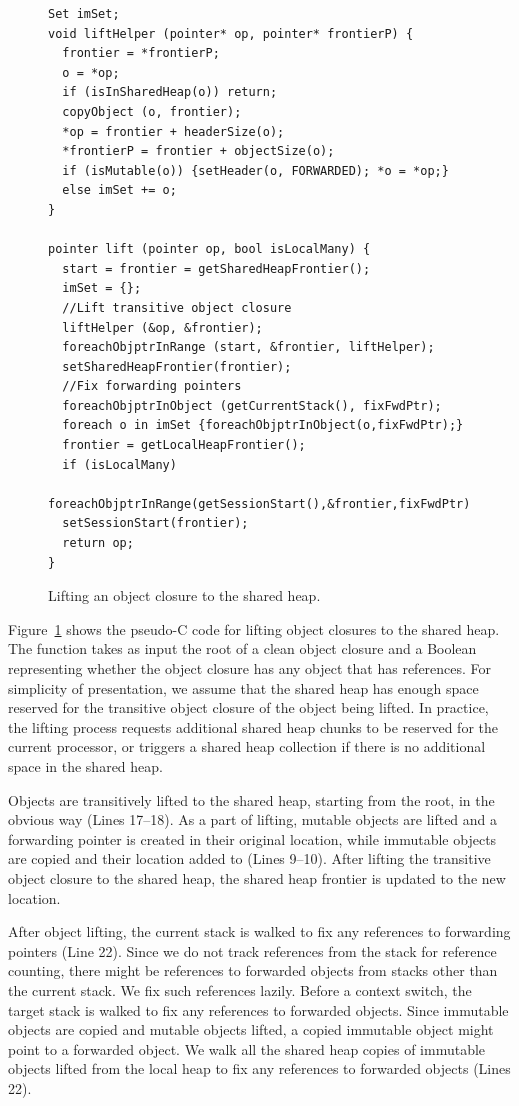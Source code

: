 \begin{figure}[t]
\renewcommand{\baselinestretch}{1.3}
\begin{lstlisting}
Set imSet;
void liftHelper (pointer* op, pointer* frontierP) {
  frontier = *frontierP;
  o = *op;
  if (isInSharedHeap(o)) return;
  copyObject (o, frontier);
  *op = frontier + headerSize(o);
  *frontierP = frontier + objectSize(o);
  if (isMutable(o)) {setHeader(o, FORWARDED); *o = *op;}
  else imSet += o;
}

pointer lift (pointer op, bool isLocalMany) {
  start = frontier = getSharedHeapFrontier();
  imSet = {};
  //Lift transitive object closure
  liftHelper (&op, &frontier);
  foreachObjptrInRange (start, &frontier, liftHelper);
  setSharedHeapFrontier(frontier);
  //Fix forwarding pointers
  foreachObjptrInObject (getCurrentStack(), fixFwdPtr);
  foreach o in imSet {foreachObjptrInObject(o,fixFwdPtr);}
  frontier = getLocalHeapFrontier();
  if (isLocalMany)
    foreachObjptrInRange(getSessionStart(),&frontier,fixFwdPtr);
  setSessionStart(frontier);
  return op;
}
\end{lstlisting}
\caption{Lifting an object closure to the shared heap.}
\label{code:lift}
\end{figure}


Figure~\ref{code:lift} shows the pseudo-C code for lifting object closures to
the shared heap. The function  takes as input the root of a clean
object closure and a Boolean representing whether the object closure has any
object that has  references. For simplicity of presentation, we
assume that the shared heap has enough space reserved for the transitive object
closure of the object being lifted. In practice, the lifting process requests
additional shared heap chunks to be reserved for the current processor, or
triggers a shared heap collection if there is no additional space in the shared
heap.

Objects are transitively lifted to the shared heap, starting from the root, in
the obvious way (Lines 17--18). As a part of lifting, mutable objects are
lifted and a forwarding pointer is created in their original location, while
immutable objects are copied and their location added to  (Lines
9--10). After lifting the transitive object closure to the shared heap, the
shared heap frontier is updated to the new location.

After object lifting, the current stack is walked to fix any references to
forwarding pointers (Line 22). Since we do not track references from the stack
for reference counting, there might be references to forwarded objects from
stacks other than the current stack. We fix such references lazily. Before a
context switch, the target stack is walked to fix any references to forwarded
objects. Since immutable objects are copied and mutable objects lifted, a
copied immutable object might point to a forwarded object. We walk all the
shared heap copies of immutable objects lifted from the local heap to fix any
references to forwarded objects (Lines 22).

